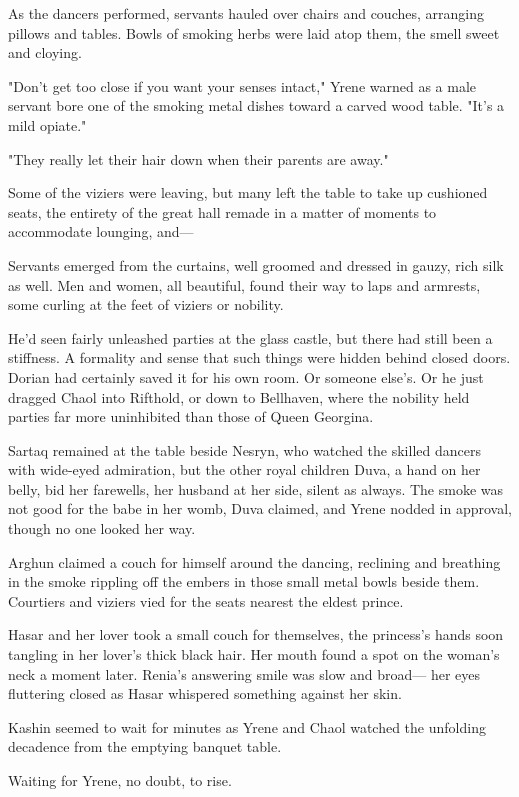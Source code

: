 As the dancers performed, servants hauled over chairs and couches, arranging pillows and tables.
Bowls of smoking herbs were laid atop them, the smell sweet and cloying.

"Don't get too close if you want your senses intact," Yrene warned as a male servant bore one of the smoking metal dishes toward a carved wood table.
"It's a mild opiate."

"They really let their hair down when their parents are away."

Some of the viziers were leaving, but many left the table to take up cushioned seats, the entirety of the great hall remade in a matter of moments to accommodate lounging, and---

Servants emerged from the curtains, well groomed and dressed in gauzy, rich silk as well.
Men and women, all beautiful, found their way to laps and armrests, some curling at the feet of viziers or nobility.

He'd seen fairly unleashed parties at the glass castle, but there had still been a stiffness.
A formality and sense that such things were hidden behind closed doors.
Dorian had certainly saved it for his own room.
Or someone else's.
Or he just dragged Chaol into Rifthold, or down to Bellhaven, where the nobility held parties far more uninhibited than those of Queen Georgina.

Sartaq remained at the table beside Nesryn, who watched the skilled dancers with wide-eyed admiration, but the other royal children 
Duva, a hand on her belly, bid her farewells, her husband at her side, silent as always.
The smoke was not good for the babe in her womb, Duva claimed, and Yrene nodded in approval, though no one looked her way.

Arghun claimed a couch for himself around the dancing, reclining and breathing in the smoke rippling off the embers in those small metal bowls beside them.
Courtiers and viziers vied for the seats nearest the eldest prince.

Hasar and her lover took a small couch for themselves, the princess's hands soon tangling in her lover's thick black hair.
Her mouth found a spot on the woman's neck a moment later.
Renia's answering smile was slow and broad--- her eyes fluttering closed as Hasar whispered something against her skin.

Kashin seemed to wait for minutes as Yrene and Chaol watched the unfolding decadence from the emptying banquet table.

Waiting for Yrene, no doubt, to rise.

